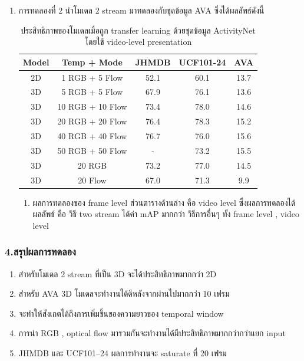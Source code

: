 \begin{enumerate}
\begin{enumerate}
	\end{enumerate}
	\item การทดลองที่ 2 นำโมเดล 2 stream มาทดลองกับชุดข้อมูล AVA ซึ่งได้ผลลัพธ์ดังนี้
	\begin{table}[!ht]
	\centering
	\begin{tabular}{|c|c|c|c|c|}
			\hline
			{Model}&{Temp + Mode}&{JHMDB}&{UCF101-24}&{AVA}\\
			\hline
			2D		& 1   RGB + 5  Flow		& 52.1		& 60.1		& 13.7		\\
			3D		& 5   RGB + 5  Flow		& 67.9		& 76.1		& 13.6		\\
			3D 		& 10 RGB + 10 Flow		& 73.4		& 78.0		& 14.6		\\
			3D		& 20 RGB + 20 Flow		& 76.4		& 78.3		& 15.2		\\
			3D		& 40 RGB + 40 Flow		& 76.7		& 76.0		& 15.6		\\
			3D		& 50 RGB + 50 Flow		& 	-		& 73.2		& 15.5		\\
			\hline
			3D		& 20 RGB				& 73.2		& 77.0		& 14.5		\\
			3D		& 20 Flow				& 67.0		& 71.3		& 9.9		\\
			\hline
		\end{tabular}
		\caption{ประสิทธิภาพของโมเดลเมื่อถูก transfer learning ด้วยชุดข้อมูล ActivityNet โดยใช้ video-level presentation}
		\label{tab: transfer learning ActivityNet}
	\end{table}
	\begin{enumerate}
		\item ผลการทดลองของ frame level ส่วนตารางด้านล่าง คือ video level ซึ่งผลการทดลองได้ผลลัพธ์ คือ วิธี two stream ได้ค่า mAP มากกว่า วิธีการอื่นๆ ทั้ง frame level , video level 
	\end{enumerate}
\end{enumerate}
\subsubsection*{4.สรุปผลการทดลอง}	
\begin{enumerate}
	\item สำหรับโมเดล 2 stream ที่เป็น 3D จะได้ประสิทธิภาพมากกว่า 2D
	\item สำหรับ AVA 3D โมเดลจะทำงานได้ดีหลังจากผ่านไปมากกว่า 10 เฟรม
	\item จะทำให้สังเกตได้ถึงการเพิ่มขึ้นของความยาวของ temporal window
	\item การนำ RGB , optical flow มารวมกันจะทำงานได้มีประสิทธิภาพมากกว่ากว่าแยก input
	\item JHMDB และ UCF101–24 ผลการทำงานจะ saturate ที่ 20 เฟรม
\end{enumerate}
